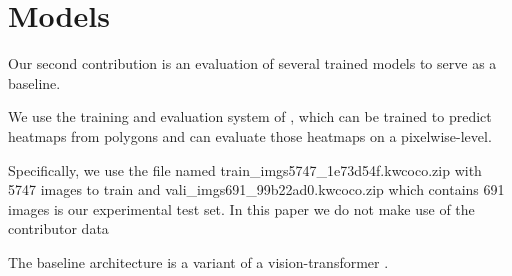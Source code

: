 \documentclass[10pt,twocolumn,letterpaper]{article}
\begin{document}
\section{Models}

Our second contribution is an evaluation of several trained models to serve as
a baseline.

We use the training and evaluation system of \cite{Greenwell_2024_WACV}, which
can be trained to predict heatmaps from polygons and can evaluate those
heatmaps on a pixelwise-level. 


Specifically, we use the file named train\_imgs5747\_1e73d54f.kwcoco.zip with
5747 images to train and vali\_imgs691\_99b22ad0.kwcoco.zip which contains 691
images is our experimental test set.
In this paper we do not make use of the contributor data


The baseline architecture is a variant \cite{bertasius2021space,Greenwell_2024_WACV} of a vision-transformer \cite{dosovitskiy_image_2021}.
\end{document}
